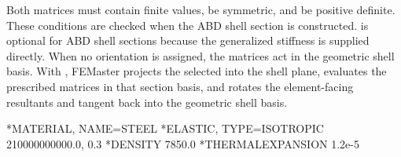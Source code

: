 Both matrices must contain finite values, be symmetric, and be positive definite. These conditions are checked when the ABD shell section is constructed.  is optional for ABD shell sections because the generalized stiffness is supplied directly. When no orientation is assigned, the matrices act in the geometric shell basis. With , FEMaster projects the selected  into the shell plane, evaluates the prescribed matrices in that section basis, and rotates the element-facing resultants and tangent back into the geometric shell basis.

\begin{exampledeck}
*MATERIAL, NAME=STEEL
*ELASTIC, TYPE=ISOTROPIC
210000000000.0, 0.3
*DENSITY
7850.0
*THERMALEXPANSION
1.2e-5
\end{exampledeck}
